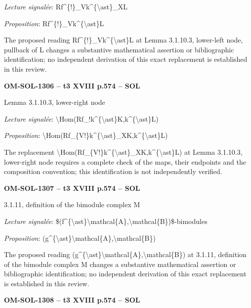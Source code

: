 \emph{Lecture signalée}: Rf\textasciicircum{}\{!\}\_Vk\textasciicircum{}\{\textbackslash{}ast\}\_XL\par
\emph{Proposition}: Rf\textasciicircum{}\{!\}\_Vk\textasciicircum{}\{\textbackslash{}ast\}L\par
The proposed reading Rf\textasciicircum{}\{!\}\_Vk\textasciicircum{}\{\textbackslash{}ast\}L at Lemma 3.1.10.3, lower-left node, pullback of L changes a substantive mathematical assertion or bibliographic identification; no independent derivation of this exact replacement is established in this review.\par
\par\noindent\textbf{OM-SOL-1306 -- t3 XVIII p.574 -- SOL}\par
Lemma 3.1.10.3, lower-right node\par
\emph{Lecture signalée}: \textbackslash{}Hom(Rf\_!k\textasciicircum{}\{\textbackslash{}ast\}K,k\textasciicircum{}\{\textbackslash{}ast\}L)\par
\emph{Proposition}: \textbackslash{}Hom(Rf\_\{V!\}k\textasciicircum{}\{\textbackslash{}ast\}\_XK,k\textasciicircum{}\{\textbackslash{}ast\}L)\par
The replacement \textbackslash{}Hom(Rf\_\{V!\}k\textasciicircum{}\{\textbackslash{}ast\}\_XK,k\textasciicircum{}\{\textbackslash{}ast\}L) at Lemma 3.1.10.3, lower-right node requires a complete check of the maps, their endpoints and the composition convention; this identification is not independently verified.\par
\par\noindent\textbf{OM-SOL-1307 -- t3 XVIII p.574 -- SOL}\par
3.1.11, definition of the bimodule complex M\par
\emph{Lecture signalée}: \$(f\textasciicircum{}\{\textbackslash{}ast\}\textbackslash{}mathcal\{A\},\textbackslash{}mathcal\{B\})\$-bimodules\par
\emph{Proposition}: (g\textasciicircum{}\{\textbackslash{}ast\}\textbackslash{}mathcal\{A\},\textbackslash{}mathcal\{B\})\par
The proposed reading (g\textasciicircum{}\{\textbackslash{}ast\}\textbackslash{}mathcal\{A\},\textbackslash{}mathcal\{B\}) at 3.1.11, definition of the bimodule complex M changes a substantive mathematical assertion or bibliographic identification; no independent derivation of this exact replacement is established in this review.\par
\par\noindent\textbf{OM-SOL-1308 -- t3 XVIII p.574 -- SOL}\par

